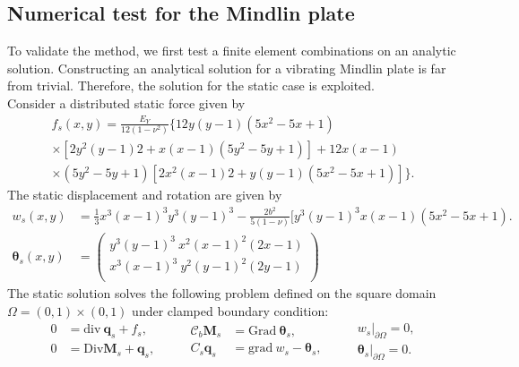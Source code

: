 \subsection{Numerical test for the Mindlin plate}\label{sec:numtest_min}
To validate the method, we first test a finite element combinations on an analytic solution. Constructing an analytical solution for a vibrating Mindlin plate is far from trivial. Therefore, the solution for the static case \cite{veiga2013} is exploited. \\

Consider a distributed static force given by 
\begin{equation*}
\begin{aligned}
f_s(x,y)=\frac{E_Y}{12 (1-\nu^2)} \{12 y(y-1)(5x^2-5x+1) \\
\times [2y^2(y-1)2+x(x-1)(5y^2-5y+1)] +12x(x-1)\\
\times (5y^2-5y+1)[2x^2(x-1)2+y(y-1)(5x^2-5x+1)]\}.
\end{aligned}
\end{equation*}
The static displacement and rotation are given by
\begin{align*}
w_s(x,y) &= \frac{1}{3} x^3(x-1)^3 y^3 (y-1)^3 -\frac{2 b^2}{5(1-\nu)}[y^3(y-1)^3 x(x-1)(5 x^2-5x+1). \\
\bm{\theta}_{s}(x,y) &= 
\begin{pmatrix}
y^3(y-1)^3 \ x^2 (x-1)^2 (2x-1) \\
x^3(x-1)^3 \ y^2 (y-1)^2 (2y-1) \\
\end{pmatrix}
\end{align*}
The static solution solves the following problem defined on the square domain $\Omega=(0,1)\times(0,1)$ under clamped boundary condition:
\begin{equation}
\begin{aligned}
0 &= \mathrm{div} \ \bm{q}_s + f_s , \\
0 &= \mathrm{Div} \bm{M}_s + \bm{q}_s, \\
\end{aligned} \qquad
\begin{aligned}
\bm{\mathcal{C}}_b\bm{M}_s &= \mathrm{Grad} \ \bm{\theta}_s, \\
C_s \bm{q}_s &= \mathrm{grad} \ w_s - \bm{\theta}_s, \\
\end{aligned}
\qquad
\begin{aligned}
w_s\vert_{\partial\Omega} = 0, \\
\bm{\theta}_s\vert_{\partial\Omega} = 0. \\
\end{aligned}
\end{equation}
